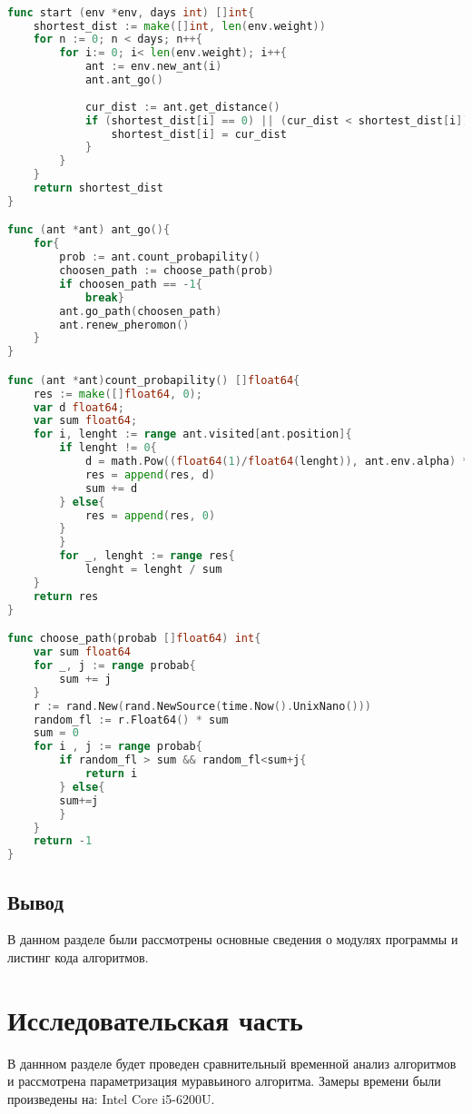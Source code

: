 \documentclass[12pt]{report}
\begin{document}
\begin{lstlisting}[label=ants,caption = Муравьиный алгоритм, language = go]

func start (env *env, days int) []int{
	shortest_dist := make([]int, len(env.weight))
	for n := 0; n < days; n++{
		for i:= 0; i< len(env.weight); i++{
			ant := env.new_ant(i)
			ant.ant_go()
			
			cur_dist := ant.get_distance()
			if (shortest_dist[i] == 0) || (cur_dist < shortest_dist[i]){
				shortest_dist[i] = cur_dist
			}
		}
	}
	return shortest_dist
}

func (ant *ant) ant_go(){
	for{
		prob := ant.count_probapility()
		choosen_path := choose_path(prob)
		if choosen_path == -1{
			break}
		ant.go_path(choosen_path)
		ant.renew_pheromon()
	}
}

func (ant *ant)count_probapility() []float64{
	res := make([]float64, 0);
	var d float64;
	var sum float64;
	for i, lenght := range ant.visited[ant.position]{
		if lenght != 0{
			d = math.Pow((float64(1)/float64(lenght)), ant.env.alpha) * math.Pow(ant.env.pheromon[ant.position][i], ant.env.betta)
			res = append(res, d)
			sum += d
		} else{
			res = append(res, 0)
		}
		}
		for _, lenght := range res{
			lenght = lenght / sum
	}
	return res
}

func choose_path(probab []float64) int{
	var sum float64
	for _, j := range probab{
		sum += j
	}
	r := rand.New(rand.NewSource(time.Now().UnixNano()))
	random_fl := r.Float64() * sum
	sum = 0
	for i , j := range probab{
		if random_fl > sum && random_fl<sum+j{
			return i
		} else{
		sum+=j
		}
	}
	return -1
}
\end{lstlisting}
\section*{Вывод}
В данном разделе были рассмотрены основные сведения о модулях программы и листинг кода алгоритмов.

\chapter{Исследовательская часть}
В даннном разделе будет проведен сравнительный временной анализ алгоритмов и рассмотрена параметризация муравьиного алгоритма. Замеры времени были произведены на: Intel Core i5-6200U.
\end{document}

